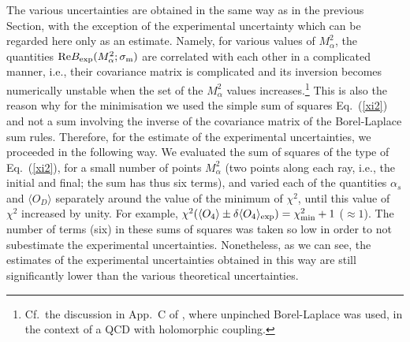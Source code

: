 \documentclass[aps,nofootinbib,showkeys,noshowpacs,preprintnumbers,amsmath,amssymb]{revtex4}
\newcommand{\sm}{{\sigma_{\rm m}}}
\begin{document}
The various uncertainties are obtained in the same way as in the previous Section, with the exception of the experimental uncertainty which can be regarded here only as an estimate. Namely, for various values of $M_{\alpha}^2$, the quantities ${\rm Re} B_{\rm exp}(M_{\alpha}^2;\sm)$ are correlated with each other in a complicated manner, i.e., their covariance matrix is complicated and its inversion becomes numerically unstable when the set of the $M^2_{\alpha}$ values increases.\footnote{Cf.~the discussion in App.~C of \cite{3dAQCD}, where unpinched Borel-Laplace was used, in the context of a QCD with holomorphic coupling.} This is also the reason why for the minimisation we used the simple sum of squares Eq.~(\ref{xi2}) and not a sum involving the inverse of the covariance matrix of the Borel-Laplace sum rules. Therefore, for the estimate of the experimental uncertainties, we proceeded in the following way. We evaluated the sum of squares of the type of Eq.~(\ref{xi2}), for a small number of points $M^2_{\alpha}$  (two points along each ray, i.e., the initial and final; the sum has thus six terms), and varied each of the quantities $\alpha_s$ and $\langle O_D \rangle$ separately around the value of the minimum of $\chi^2$, until this value of $\chi^2$ increased by unity. For example, $\chi^2(\langle O_4 \rangle \pm \delta \langle O_4 \rangle_{\rm exp}) = \chi^2_{\rm min} +1$ ($\approx 1$). The number of terms (six) in these sums of squares was taken so low in order to not subestimate the experimental uncertainties. Nonetheless, as we can see, the estimates of the experimental uncertainties obtained in this way are still significantly lower than the various theoretical uncertainties.
\end{document}
